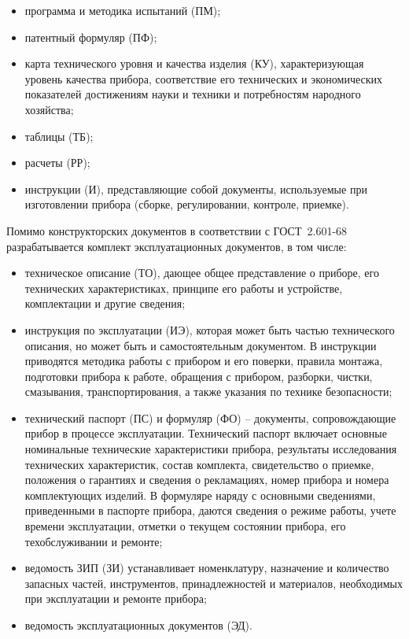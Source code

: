 \begin{itemize}
	\item программа и методика испытаний (ПМ);
	\item патентный формуляр (ПФ);
	\item карта технического уровня и качества изделия (КУ), характеризующая уровень качества прибора, соответствие его технических и экономических показателей достижениям науки и техники и потребностям народного хозяйства;
	\item таблицы (ТБ);
	\item расчеты (РР);
	\item инструкции (И), представляющие собой документы, используемые при изготовлении прибора (сборке, регулировании, контроле, приемке).
\end{itemize}

Помимо конструкторских документов в соответствии с ГОСТ~2.601-68 разрабатывается комплект эксплуатационных документов, в том числе:
\begin{itemize}
	\item техническое описание (ТО), дающее общее представление о приборе, его технических характеристиках, принципе его работы и устройстве, комплектации и другие сведения;
	\item инструкция по эксплуатации (ИЭ), которая может быть частью технического описания, но может быть и самостоятельным документом. В инструкции приводятся методика работы с прибором и его поверки, правила монтажа, подготовки прибора к работе, обращения с прибором, разборки, чистки, смазывания, транспортирования, а также указания по технике безопасности;
	\item технический паспорт (ПС) и формуляр (ФО) -- документы, сопровождающие прибор в процессе эксплуатации. Технический паспорт включает основные номинальные технические характеристики прибора, результаты исследования технических характеристик, состав комплекта, свидетельство о приемке, положения о гарантиях и сведения о рекламациях, номер прибора и номера комплектующих изделий. В формуляре наряду с основными сведениями, приведенными в паспорте прибора, даются сведения о режиме работы, учете времени эксплуатации, отметки о текущем состоянии прибора, его техобслуживании и ремонте;
	\item ведомость ЗИП (ЗИ) устанавливает номенклатуру, назначение и количество запасных частей, инструментов, принадлежностей и материалов, необходимых при эксплуатации и ремонте прибора;
	\item ведомость эксплуатационных документов (ЭД).
\end{itemize}

